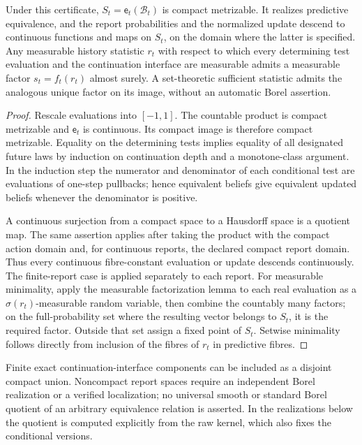 \begin{proposition}\label{prop:quotient}
Under this certificate, $S_t=\mathsf e_t(\mathcal B_t)$ is compact metrizable. It realizes predictive equivalence, and the report probabilities and the normalized update descend to continuous functions and maps on $S_t$, on the domain where the latter is specified. Any measurable history statistic $r_t$ with respect to which every determining test evaluation and the continuation interface are measurable admits a measurable factor $s_t=f_t(r_t)$ almost surely. A set-theoretic sufficient statistic admits the analogous unique factor on its image, without an automatic Borel assertion.
\end{proposition}
\begin{proof}
Rescale evaluations into $[-1,1]$. The countable product is compact metrizable and $\mathsf e_t$ is continuous. Its compact image is therefore compact metrizable. Equality on the determining tests implies equality of all designated future laws by induction on continuation depth and a monotone-class argument. In the induction step the numerator and denominator of each conditional test are evaluations of one-step pullbacks; hence equivalent beliefs give equivalent updated beliefs whenever the denominator is positive.

A continuous surjection from a compact space to a Hausdorff space is a quotient map. The same assertion applies after taking the product with the compact action domain and, for continuous reports, the declared compact report domain. Thus every continuous fibre-constant evaluation or update descends continuously. The finite-report case is applied separately to each report. For measurable minimality, apply the measurable factorization lemma to each real evaluation as a $\sigma(r_t)$-measurable random variable, then combine the countably many factors; on the full-probability set where the resulting vector belongs to $S_t$, it is the required factor. Outside that set assign a fixed point of $S_t$. Setwise minimality follows directly from inclusion of the fibres of $r_t$ in predictive fibres.
\end{proof}

Finite exact continuation-interface components can be included as a disjoint compact union. Noncompact report spaces require an independent Borel realization or a verified localization; no universal smooth or standard Borel quotient of an arbitrary equivalence relation is asserted. In the realizations below the quotient is computed explicitly from the raw kernel, which also fixes the conditional versions.


